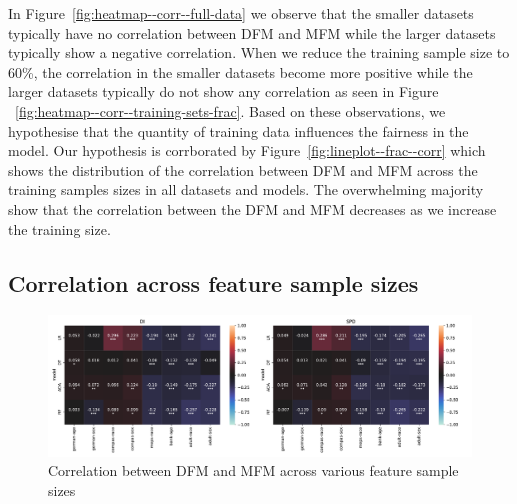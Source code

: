 \documentclass{article}
\begin{document}
In Figure \ref{fig:heatmap--corr--full-data} we observe that the
smaller datasets typically have no correlation between DFM and MFM
while the larger datasets typically show a negative correlation. When
we reduce the training sample size to 60\%, the correlation in the
smaller datasets become more positive while the larger datasets
typically do not show any correlation as seen in Figure
 \ref{fig:heatmap--corr--training-sets-frac}. Based on these
observations, we hypothesise that the quantity of training data
influences the fairness in the model. Our hypothesis is corrborated by
Figure \ref{fig:lineplot--frac--corr} which shows the distribution of
the correlation between DFM and MFM across the training samples sizes
in all datasets and models. The overwhelming majority show that the
correlation between the DFM and MFM decreases as we increase the
training size.






\subsection{Correlation across feature sample sizes}\label{sec:results-feature-sets}

\begin{figure}
  \centering
  \includegraphics[width=0.95\linewidth]{heatmap--corr--num-features.pdf}
  \caption{Correlation between DFM and MFM across various feature
    sample sizes}
  \label{fig:heatmap--corr--num-features}
\end{figure}
\end{document}
